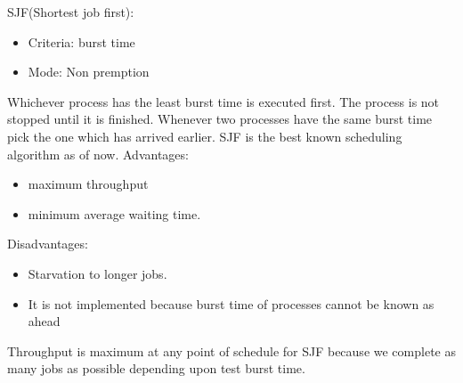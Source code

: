 \documentclass[12pt,letterpaper]{article}
\begin{document}
SJF(Shortest job first):
\begin{itemize}
	\item Criteria: burst time 
	\item Mode: Non premption
\end{itemize}
Whichever process has the least burst time is executed first. The process is not stopped until it is finished.
Whenever two processes have the same burst time pick the one which has arrived earlier. SJF is the best known scheduling algorithm as of now.
Advantages:
\begin{itemize}
	\item maximum throughput
	\item minimum average waiting time.
\end{itemize}
Disadvantages:
\begin{itemize}
	\item Starvation to longer jobs.
	\item It is not implemented because burst time of processes cannot be known as ahead \end{itemize}
Throughput is maximum at any point of schedule for SJF because we complete as many jobs as possible depending upon test burst time.
\end{document}
